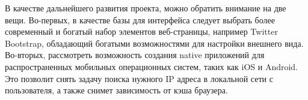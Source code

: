 В качестве дальнейшего развития проекта, можно обратить внимание на две вещи. Во-первых, в качестве базы для интерфейса следует выбрать более современный и богатый набор элементов веб-страницы, например Twitter Bootstrap, обладающий богатыми возможностями для настройки внешнего вида. Во-вторых, рассмотреть возможность создания native приложений для распространенных мобильных операционных систем, таких как iOS и Android. Это позволит снять задачу поиска нужного IP адреса в локальной сети с пользователя, а также снимет зависимость от кэша браузера.